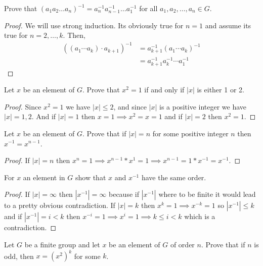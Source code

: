 \begin{problem}
    Prove that $(a_1 a_2 \dots a_n)^{-1} = a_n^{-1} a_{n-1}^{-1} \dots a_1^{-1}$ for all $a_1, a_2, \dots, a_n \in G$.
\end{problem}

\begin{proof}
    We will use strong induction. Its obviously true for $n=1$ and assume its true for $n=2,\ldots,k$. Then,
    \begin{align*}
        ((a_1 \cdots a_{k}) \cdot a_{k+1})^{-1} &= a_{k+1}^{-1} (a_1 \cdots a_k)^{-1} \\
        &= a_{k+1}^{-1} a_k^{-1} \cdots a_1^{-1}
    \end{align*}
\end{proof}

\begin{problem}
    Let $x$ be an element of $G$. Prove that $x^2 = 1$ if and only if $|x|$ is either 1 or 2.
\end{problem}

\begin{proof}
    Since $x^2=1$ we have $|x| \le 2$, and since $|x|$ is a positive integer we have $|x| = 1,2$. And if $|x|=1$ then $x=1 \implies x^2=x=1$
    and if $|x|=2$ then $x^2=1$.
\end{proof}

\begin{problem}
    Let $x$ be an element of $G$. Prove that if $|x| = n$ for some positive integer $n$ then $x^{-1} = x^{n-1}$.
\end{problem}

\begin{proof}
    If $|x|=n$ then $x^n=1 \implies x^{n-1} * x^{1} = 1 \implies x^{n-1} = 1 * x^{-1} = x^{-1}$.
\end{proof}

\begin{problem}
 For $x$ an element in $G$ show that $x$ and $x^{-1}$ have the same order.
\end{problem}

\begin{proof}
    If $|x|= \infty$ then $|x^{-1}|=\infty$ because if $|x^{-1}|$ where to be finite it would lead to a pretty obvious contradiction.
    If $|x|=k$ then $x^k=1 \implies x^{-k}=1$ so $|x^{-1}| \le k$ and if $|x^{-1}| = i < k$ then $x^{-i}=1 \implies x^{i}=1 
    \implies k \le i < k$ which is a contradiction.
\end{proof}

\begin{problem}
    Let $G$ be a finite group and let $x$ be an element of $G$ of order $n$. Prove that if $n$ is odd, then $x = (x^2)^k$ for some $k$.
\end{problem}

